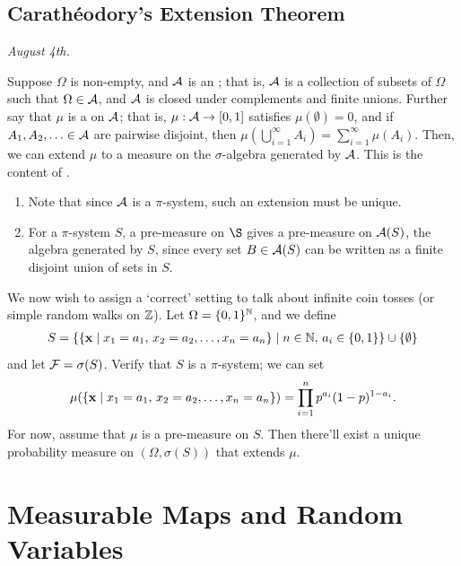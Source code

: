 \subsection{Carathéodory's Extension Theorem}
\textit{August 4th.}

Suppose $\Omega$ is non-empty, and $\mathcal{A}$ is an ; that is, $\mathcal{A}$ is a collection of subsets of $\Omega$ such that $\Omega \in \mathcal{A}$, and $\mathcal{A}$ is closed under complements and finite unions. Further say that $\mu$ is a  on $\mathcal{A}$; that is, $\mu:\mathcal{A} \to [0,1]$ satisfies $\mu(\emptyset) = 0$, and if $A_{1},A_{2},\ldots \in \mathcal{A}$ are pairwise disjoint, then $\mu(\bigcup_{i=1}^{\infty}A_{i}) = \sum_{i=1}^{\infty}\mu(A_{i})$. Then, we can extend $\mu$ to a measure on the $\sigma$-algebra generated by $\mathcal{A}$. This is the content of .

\begin{remark}
    \begin{enumerate}
        \item Note that since $\mathcal{A}$ is a $\pi$-system, such an extension must be unique.
        \item For a $\pi$-system $S$, a pre-measure on $\S$ gives a pre-measure on $\mathcal{A}(S)$, the algebra generated by $S$, since every set $B \in \mathcal{A}(S)$ can be written as a finite disjoint union of sets in $S$.
    \end{enumerate}
\end{remark}

We now wish to assign a `correct' setting to talk about infinite coin tosses (or simple random walks on $\mathbb{Z}$). Let $\Omega = \{0,1\}^{\mathbb{N}}$, and we define
\begin{align}
    S = \{\{\mathbf{x} \mid x_{1} = a_{1},\, x_{2} = a_{2},\ldots,x_{n} = a_{n} \} \mid n \in \mathbb{N}, \, a_{i} \in \{0,1\}\} \cup \{\emptyset\}
\end{align}
and let $\mathcal{F} = \sigma(S)$. Verify that $S$ is a $\pi$-system; we can set
\begin{align}
    \mu(\{\mathbf{x} \mid x_{1} = a_{1},\, x_{2} = a_{2},\ldots,x_{n} = a_{n} \}) = \prod_{i=1}^{n} p^{a_{i}}(1-p)^{1-a_{i}}.
\end{align}
For now, assume that $\mu$ is a pre-measure on $S$. Then there'll exist a unique probability measure on $(\Omega,\sigma(S))$ that extends $\mu$.

\section{Measurable Maps and Random Variables}

